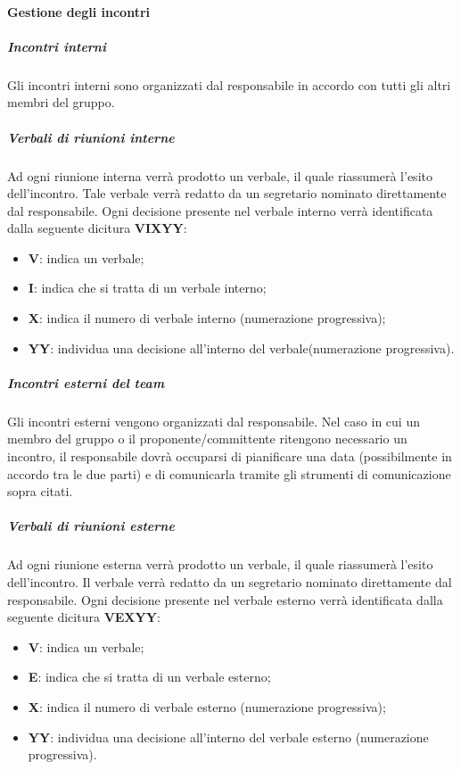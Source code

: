 			
			\paragraph{Gestione degli incontri}
			
				\subparagraph{Incontri interni}
				Gli incontri interni sono organizzati dal responsabile in accordo con tutti gli altri membri del gruppo. 
				
				\subparagraph{Verbali di riunioni interne}
				Ad ogni riunione interna verrà prodotto un verbale, il quale riassumerà l'esito dell'incontro. Tale verbale verrà redatto da un segretario nominato direttamente dal responsabile. Ogni decisione presente nel verbale interno verrà identificata dalla seguente dicitura \textbf{VIXYY}:
				\begin{itemize}
					\item \textbf{V}: indica un verbale;
					\item\textbf{I}: indica che si tratta di un verbale interno;
					\item\textbf{X}: indica il numero di verbale interno (numerazione progressiva);
					\item\textbf{YY}: individua una decisione all'interno del verbale(numerazione progressiva).
				\end{itemize}
			
				\subparagraph{Incontri esterni del team}
				Gli incontri esterni vengono organizzati dal responsabile. Nel caso in cui un membro del gruppo o il proponente/committente ritengono necessario un incontro, il responsabile dovrà occuparsi di pianificare una data (possibilmente in accordo tra le due parti) e di comunicarla tramite gli strumenti di comunicazione sopra citati.
				
				\subparagraph{Verbali di riunioni esterne}
				Ad ogni riunione esterna verrà prodotto un verbale, il quale riassumerà l'esito dell'incontro. Il verbale verrà redatto da un segretario nominato direttamente dal responsabile. Ogni decisione presente nel verbale esterno verrà identificata dalla seguente dicitura \textbf{VEXYY}:
				\begin{itemize}
					\item\textbf{V}: indica un verbale;
					\item\textbf{E}: indica che si tratta di un verbale esterno;
					\item\textbf{X}: indica il numero di verbale esterno (numerazione progressiva);
					\item\textbf{YY}: individua una decisione all'interno del verbale esterno (numerazione progressiva).
				\end{itemize}
			
